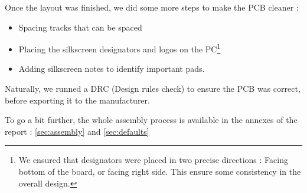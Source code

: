 Once the layout was finished, we did some more steps to make the PCB cleaner :

\begin{itemize}[noitemsep]
    \item   Spacing tracks that can be spaced
    \item   Placing the silkscreen designators and logos on the PC\footnote{
              We ensured that designators were placed in two precise directions :
              Facing bottom of the board, or facing right side. This ensure some
              consistency in the overall design.
          }
    \item   Adding silkscreen notes to identify important pads.
\end{itemize}

Naturally, we runned a DRC (Design rules check) to ensure the PCB was correct, before
exporting it to the manufacturer.

To go a bit further, the whole assembly process is available in the annexes of the
report : \ref{sec:assembly} and \ref{sec:defaults}